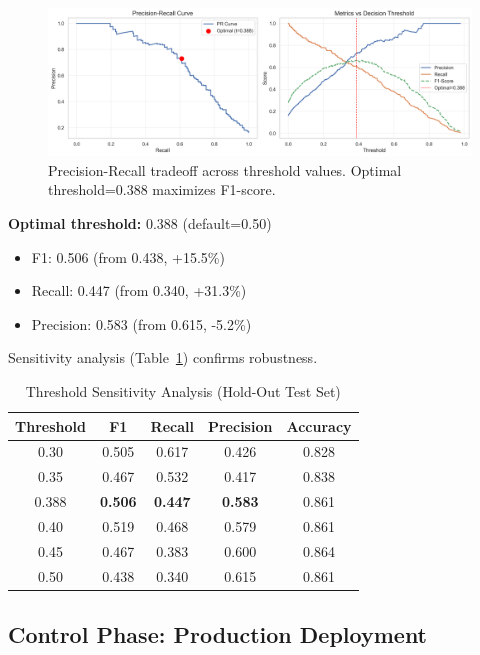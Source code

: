 \documentclass[conference]{IEEEtran}
\begin{document}
\begin{figure}[!t]
  \centering
  \includegraphics[width=\linewidth]{threshold_optimization.png}
  \caption{Precision-Recall tradeoff across threshold values. Optimal threshold=0.388 maximizes F1-score.}
  \label{fig:threshold_opt}
\end{figure}

\textbf{Optimal threshold:} 0.388 (default=0.50)
\begin{itemize}
    \item F1: 0.506 (from 0.438, +15.5\%)
    \item Recall: 0.447 (from 0.340, +31.3\%)
    \item Precision: 0.583 (from 0.615, -5.2\%)
\end{itemize}

Sensitivity analysis (Table~\ref{tab:threshold_sensitivity}) confirms robustness.

\begin{table}[!t]
\caption{Threshold Sensitivity Analysis (Hold-Out Test Set)}
\label{tab:threshold_sensitivity}
\centering
\small
\begin{tabular}{ccccc}
\toprule
\textbf{Threshold} & \textbf{F1} & \textbf{Recall} & \textbf{Precision} & \textbf{Accuracy} \\
\midrule
0.30 & 0.505 & 0.617 & 0.426 & 0.828 \\
0.35 & 0.467 & 0.532 & 0.417 & 0.838 \\
0.388 & \textbf{0.506} & \textbf{0.447} & \textbf{0.583} & 0.861 \\
0.40 & 0.519 & 0.468 & 0.579 & 0.861 \\
0.45 & 0.467 & 0.383 & 0.600 & 0.864 \\
0.50 & 0.438 & 0.340 & 0.615 & 0.861 \\
\bottomrule
\end{tabular}
\end{table}

\subsection{Control Phase: Production Deployment}
\end{document}
